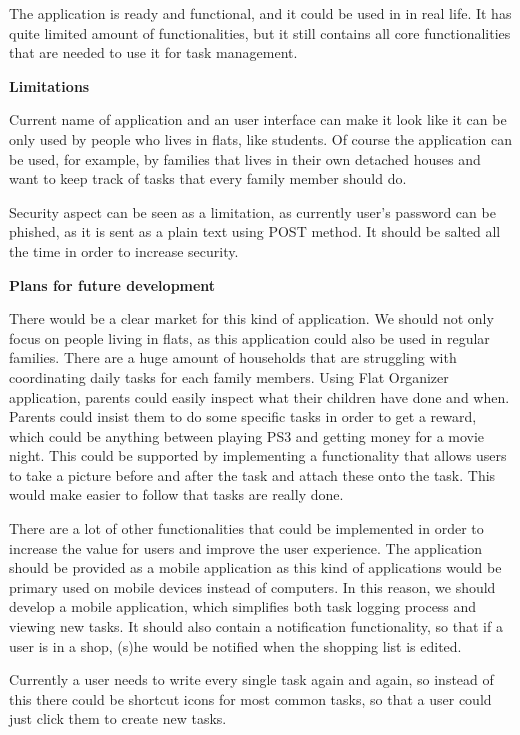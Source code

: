 \documentclass{sig-alt-release2}
\begin{document}
The application is ready and functional, and it could be used in in real life. It has quite limited amount of functionalities, but it still contains all core functionalities that are needed to use it for task management.

\textbf{Limitations}

Current name of application and an user interface can make it look like it can be only used by people who lives in flats, like students. Of course the application can be used, for example, by families that lives in their own detached houses and want to keep track of tasks that every family member should do.

Security aspect can be seen as a limitation, as currently user’s password can be phished, as it is sent as a plain text using POST method. It should be salted all the time in order to increase security.

\textbf{Plans for future development}

There would be a clear market for this kind of application. We should not only focus on people living in flats, as this application could also be used in regular families. There are a huge amount of households that are struggling with coordinating daily tasks for each family members. Using Flat Organizer application, parents could easily inspect what their children have done and when. Parents could insist them to do some specific tasks in order to get a reward, which could be anything between playing PS3 and getting money for a movie night. This could be supported by implementing a functionality that allows users to take a picture before and after the task and attach these onto the task. This would make easier to follow that tasks are really done.

There are a lot of other functionalities that could be implemented in order to increase the value for users and improve the user experience. The application should be provided as a mobile application as this kind of applications would be primary used on mobile devices instead of computers. In this reason, we should develop a mobile application, which simplifies both task logging process and viewing new tasks. It should also contain a notification functionality, so that if a user is in a shop, (s)he would be notified when the shopping list is edited.

Currently a user needs to write every single task again and again, so instead of this there could be shortcut icons for most common tasks, so that a user could just click them to create new tasks. 
\end{document}
